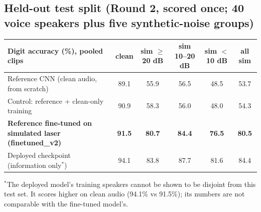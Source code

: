 \documentclass{article}
\begin{document}
\subsection{Held-out test split (Round 2, scored once; 40 voice speakers plus five synthetic-noise groups)}
\begin{center}
\footnotesize
\begin{tabular}{|l|c|c|c|c|c|}
\hline
\rowcolor{headerblue}\textbf{Digit accuracy (\%), pooled clips} & \textbf{clean} & \textbf{sim $\geq$20 dB} & \textbf{sim 10--20 dB} & \textbf{sim $<$10 dB} & \textbf{all sim} \\ \hline
Reference CNN (clean audio, from scratch) & 89.1 & 55.9 & 56.5 & 48.5 & 53.7 \\ \hline
Control: reference + clean-only training & 90.9 & 58.3 & 56.0 & 48.0 & 54.3 \\ \hline
\textbf{Reference fine-tuned on simulated laser (finetuned\_v2)} & \textbf{91.5} & \textbf{80.7} & \textbf{84.4} & \textbf{76.5} & \textbf{80.5} \\ \hline
Deployed checkpoint (information only$^{*}$) & 94.1 & 83.8 & 87.7 & 81.6 & 84.4 \\ \hline
\end{tabular}

\vspace{3pt}
\end{center}
{\footnotesize $^{*}$The deployed model's training speakers cannot be shown to be disjoint from this test set. It scores higher on clean audio (94.1\% vs 91.5\%); its numbers are not comparable with the fine-tuned model's.}
\end{document}
